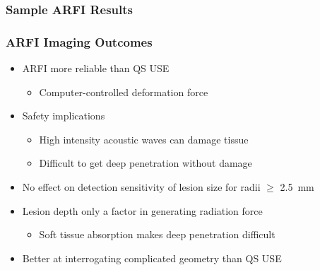 \documentclass{beamer}
\begin{document}
		\begin{frame}
			\frametitle{Sample ARFI Results}
			\vspace{0.25cm}
			\begin{figure}
				\centering
				\vspace{-0.25cm}
			\end{figure}
		\end{frame}

		\begin{frame}
			\frametitle{ARFI Imaging Outcomes}
			\begin{itemize}
				\item ARFI more reliable than QS USE
				\begin{itemize}
					\item Computer-controlled deformation force
				\end{itemize}
				\item Safety implications
				\begin{itemize}
					\item High intensity acoustic waves can damage tissue
					\item Difficult to get deep penetration without damage
				\end{itemize}
				\item No effect on detection sensitivity of lesion size for radii $\geq$ \SI{2.5}{\mm}
				\item Lesion depth only a factor in generating radiation force
				\begin{itemize}
					\item Soft tissue absorption makes deep penetration difficult
				\end{itemize}
				\item Better at interrogating complicated geometry than QS USE
			\end{itemize}
		\end{frame}
\end{document}
